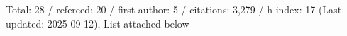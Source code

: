 Total: 28 / refereed: 20 / first author: 5 / citations: 3,279 / h-index: 17 (Last updated: 2025-09-12), List attached below